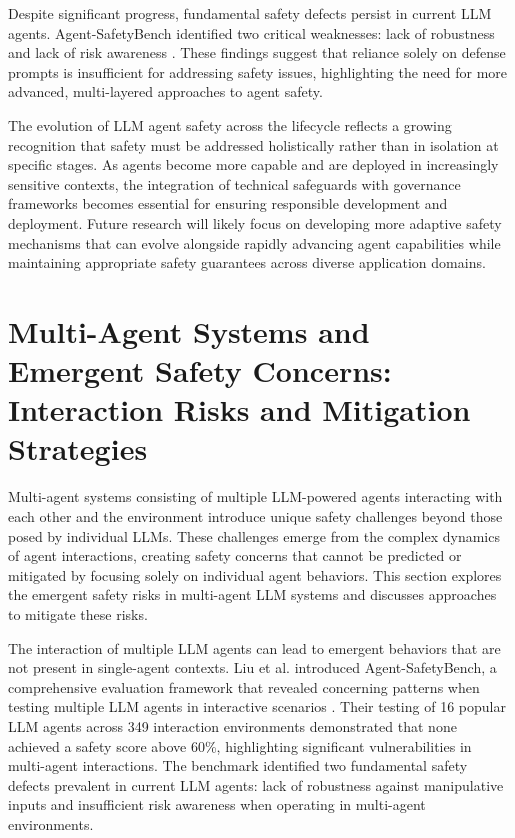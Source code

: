 \documentclass[conference]{IEEEtran}
\begin{document}
Despite significant progress, fundamental safety defects persist in current LLM agents. Agent-SafetyBench identified two critical weaknesses: lack of robustness and lack of risk awareness \cite{2412.14470}. These findings suggest that reliance solely on defense prompts is insufficient for addressing safety issues, highlighting the need for more advanced, multi-layered approaches to agent safety.

The evolution of LLM agent safety across the lifecycle reflects a growing recognition that safety must be addressed holistically rather than in isolation at specific stages. As agents become more capable and are deployed in increasingly sensitive contexts, the integration of technical safeguards with governance frameworks becomes essential for ensuring responsible development and deployment. Future research will likely focus on developing more adaptive safety mechanisms that can evolve alongside rapidly advancing agent capabilities while maintaining appropriate safety guarantees across diverse application domains.



\section{Multi-Agent Systems and Emergent Safety Concerns: Interaction Risks and Mitigation Strategies}

Multi-agent systems consisting of multiple LLM-powered agents interacting with each other and the environment introduce unique safety challenges beyond those posed by individual LLMs. These challenges emerge from the complex dynamics of agent interactions, creating safety concerns that cannot be predicted or mitigated by focusing solely on individual agent behaviors. This section explores the emergent safety risks in multi-agent LLM systems and discusses approaches to mitigate these risks.

The interaction of multiple LLM agents can lead to emergent behaviors that are not present in single-agent contexts. Liu et al. introduced Agent-SafetyBench, a comprehensive evaluation framework that revealed concerning patterns when testing multiple LLM agents in interactive scenarios \cite{2412.14470}. Their testing of 16 popular LLM agents across 349 interaction environments demonstrated that none achieved a safety score above 60\%, highlighting significant vulnerabilities in multi-agent interactions. The benchmark identified two fundamental safety defects prevalent in current LLM agents: lack of robustness against manipulative inputs and insufficient risk awareness when operating in multi-agent environments.
\end{document}
